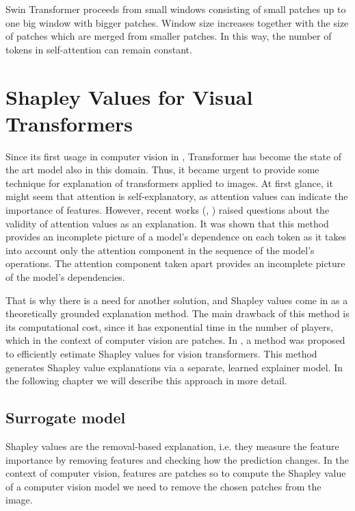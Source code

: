 \documentclass[magisterska,en]{pracamgr}
\begin{document}
Swin Transformer proceeds from small windows consisting of small patches up to one big window with bigger patches. Window size increases together with the size of patches which are merged from smaller patches. In this way, the number of tokens in self-attention can remain constant.







\chapter{Shapley Values for Visual Transformers}\label{r:visual_shap}
Since its first usage in computer vision in
\cite{DBLP:conf/iclr/DosovitskiyB0WZ21}, Transformer has become the state of the art model also in this domain. Thus, it became urgent to provide some technique for explanation of transformers applied to images. At first glance, it might seem that attention is self-explanatory, as attention values can indicate the importance of features. However, recent works (\cite{DBLP:conf/acl/SerranoS19},
\cite{DBLP:conf/cvpr/CheferGW21}) raised questions about the validity of attention values as an explanation. It was shown that this method provides an incomplete picture of a model's dependence on each token as it takes into account only the attention component in the sequence of the model's operations. The attention component taken apart provides an incomplete picture of the model's dependencies.

That is why there is a need for another solution, and Shapley values come in as a theoretically grounded explanation method. The main drawback of this method is its computational cost, since it has exponential time in the number of players, which in the context of computer vision are patches. In \cite{DBLP:conf/iclr/Covert0L23}, a method was proposed to efficiently estimate Shapley values for vision transformers. This method generates Shapley value explanations via a separate, learned explainer model. In the following chapter we will describe this approach in more detail.



\section{Surrogate model}\label{s:surrogate}
Shapley values are the removal-based explanation, i.e. they measure the feature importance by removing features and checking how the prediction changes. In the context of computer vision, features are patches so to compute the Shapley value of a computer vision model we need to remove the chosen patches from the image.
\end{document}
